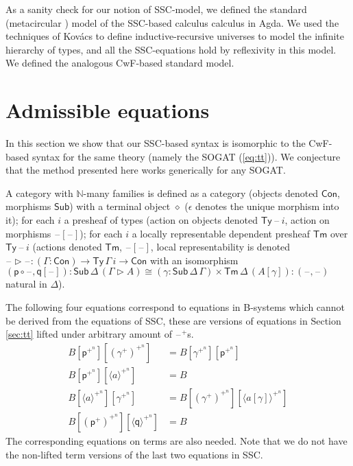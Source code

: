 \documentclass[sigplan,10pt,anonymous,review]{acmart}\settopmatter{printfolios=true,printccs=false,printacmref=false}
\newcommand{\ra}{\rightarrow}
\newcommand{\Ty}{\mathsf{Ty}}
\newcommand{\Tm}{\mathsf{Tm}}
\newcommand{\Con}{\mathsf{Con}}
\newcommand{\Sub}{\mathsf{Sub}}
\newcommand{\p}{\mathsf{p}}
\newcommand{\q}{\mathsf{q}}
\newcommand{\ext}{\mathop{\triangleright}}
\newcommand{\N}{\mathbb{N}}
\newcommand{\blank}{\mathord{\hspace{1pt}\text{--}\hspace{1pt}}} %
\begin{document}
As a sanity check for our notion of SSC-model, we defined the standard
(metacircular \cite{DBLP:conf/popl/AltenkirchK16}) model of the
SSC-based calculus calculus in Agda. We used the techniques of Kovács
\cite{DBLP:conf/csl/Kovacs22} to define inductive-recursive universes
to model the infinite hierarchy of types, and all the SSC-equations
hold by reflexivity in this model. We defined the analogous CwF-based
standard model.


\section{Admissible equations}
\label{sec:admissible}

In this section we show that our SSC-based syntax is isomorphic to the
CwF-based syntax for the same theory (namely the SOGAT
(\ref{eq:tt})). We conjecture that the method presented here works
generically for any SOGAT.

\begin{definition}[CwF]\label{def:cwf}
  A category with $\N$-many families is defined as a category (objects
  denoted $\Con$, morphisms $\Sub$) with a terminal object $\diamond$
  ($\epsilon$ denotes the unique morphism into it); for each $i$ a
  presheaf of types (action on objects denoted $\Ty\,\blank\,i$,
  action on morphisms $\blank[\blank]$); for each $i$ a locally
  representable dependent presheaf $\Tm$ over $\Ty\,\blank\,i$
  (actions denoted $\Tm$, $\blank[\blank]$, local representability is
  denoted $\blank\ext\blank : (\Gamma:\Con)\ra\Ty\,\Gamma\,i\ra\Con$
  with an isomorphism
  $
  (\p\circ\blank,\q[\blank]) : \Sub\,\Delta\,(\Gamma\ext A) \cong (\gamma:\Sub\,\Delta\,\Gamma)\times\Tm\,\Delta\,(A[\gamma]) : (\blank,\blank)
  $
  natural in $\Delta$).
\end{definition}

The following four equations correspond to equations in B-systems which cannot
be derived from the equations of SSC, these are versions of equations in Section
\ref{sec:tt} lifted under arbitrary amount of $\blank^+$s.
\begin{equation}\label{eq:lifted}
\begin{aligned}
  B[\p^{+^n}][(\gamma^+)^{+^n}] & = B[\gamma^{+^n}][\p^{+^n}] \\
  B[\p^{+^n}][\langle a \rangle^{+^n}] & = B \\
  B[\langle a \rangle^{+^n}][\gamma^{+^n}] & = B[(\gamma^+)^{+^n}][\langle a[\gamma] \rangle^{+^n}] \\
  B[(\p^+)^{+^n}][\langle\q\rangle^{+^n}] & = B
\end{aligned}
\end{equation}
The corresponding equations on terms are also needed. Note that we do not have
the non-lifted term versions of the last two equations in SSC.
\end{document}
